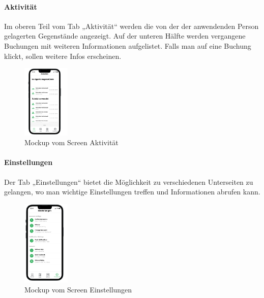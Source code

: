 \paragraph{Aktivität}Im oberen Teil vom Tab „Aktivität“ werden die von der der anwendenden Person gelagerten Gegenstände angezeigt. Auf der unteren Hälfte werden vergangene Buchungen mit weiteren Informationen aufgelistet. Falls man auf eine Buchung klickt, sollen weitere Infos erscheinen.\\
\begin{figure}[H]
  \centering
  \includegraphics[width=0.2\textwidth]{images/app_mock_objects}
  \caption{Mockup vom Screen Aktivität}
  \label{fig:screenactivity}
\end{figure}

\paragraph{Einstellungen}Der Tab „Einstellungen“ bietet die Möglichkeit zu verschiedenen Unterseiten zu gelangen, wo man wichtige Einstellungen treffen und Informationen abrufen kann.\\
\begin{figure}[H]
  \centering
  \includegraphics[width=0.2\textwidth]{images/app_mock_settings}
  \caption{Mockup vom Screen Einstellungen}
  \label{fig:screensettings}
\end{figure}


